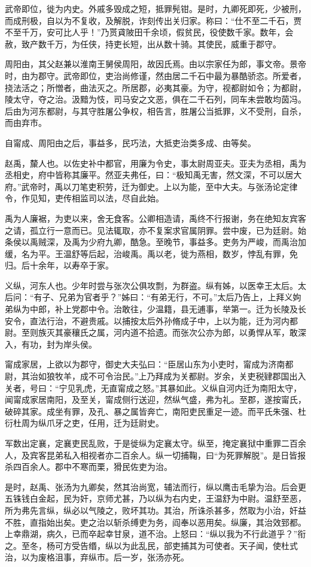 \documentclass[]{article}
\begin{document}
武帝即位，徙为内史。外戚多毁成之短，抵罪髡钳。是时，九卿死即死，少被刑，而成刑极，自以为不复收，及解脱，诈刻传出关归家。称曰：``仕不至二千石，贾不至千万，安可比人乎！''乃贳貣陂田千余顷，假贫民，役使数千家。数年，会赦，致产数千万，为任侠，持吏长短，出从数十骑。其使民，威重于郡守。

周阳由，其父赵兼以淮南王舅侯周阳，故因氏焉。由以宗家任为郎，事文帝。景帝时，由为郡守。武帝即位，吏治尚修谨，然由居二千石中最为暴酷骄恣。所爱者，挠法活之；所憎者，曲法灭之。所居郡，必夷其豪。为守，视都尉如令；为都尉，陵太守，夺之治。汲黯为忮，司马安之文恶，俱在二千石列，同车未尝敢均茵冯。后由为河东都尉，与其守胜屠公争权，相告言，胜屠公当抵罪，义不受刑，自杀，而由弃市。

自甯成、周阳由之后，事益多，民巧法，大抵吏治类多成、由等矣。

赵禹，斄人也。以佐史补中都官，用廉为令史，事太尉周亚夫。亚夫为丞相，禹为丞相史，府中皆称其廉平。然亚夫弗任，曰：``极知禹无害，然文深，不可以居大府。''武帝时，禹以刀笔吏积劳，迁为御史。上以为能，至中大夫。与张汤论定律令，作见知，吏传相监司以法，尽自此始。

禹为人廉裾，为吏以来，舍无食客。公卿相造请，禹终不行报谢，务在绝知友宾客之请，孤立行一意而已。见法辄取，亦不复案求官属阴罪。尝中废，已为廷尉。始条侯以禹贼深，及禹为少府九卿，酷急。至晚节，事益多。吏务为严峻，而禹治加缓，名为平。王温舒等后起，治峻禹。禹以老，徙为燕相，数岁，悖乱有罪，免归。后十余年，以寿卒于家。

义纵，河东人也。少年时尝与张次公俱攻剽，为群盗。纵有姊，以医幸王太后。太后问：``有子、兄弟为官者乎？''姊曰：``有弟无行，不可。''太后乃告上，上拜义姁弟纵为中郎，补上党郡中令。治敢往，少温籍，县无逋事，举第一。迁为长陵及长安令，直法行治，不避贵戚。以捕按太后外孙脩成子中，上以为能，迁为河内都尉。至则族灭其豪穰氏之属，河内道不拾遗。而张次公亦为郎，以勇悍从军，敢深入，有功，封为岸头侯。

甯成家居，上欲以为郡守，御史大夫弘曰：``臣居山东为小吏时，甯成为济南都尉，其治如狼牧羊，成不可令治民。''上乃拜成为关都尉。岁余，关吏税肄郡国出入关者，号曰：``宁见乳虎，无直甯成之怒。''其暴如此。义纵自河内迁为南阳太守，闻甯成家居南阳，及至关，甯成侧行送迎，然纵气盛，弗为礼。至郡，遂按甯氏，破碎其家。成坐有罪，及孔、暴之属皆奔亡，南阳吏民重足一迹。而平氏朱强、杜衍杜周为纵爪牙之吏，任用，迁为廷尉史。

军数出定襄，定襄吏民乱败，于是徙纵为定襄太守。纵至，掩定襄狱中重罪二百余人，及宾客昆弟私入相视者亦二百余人。纵一切捕鞠，曰``为死罪解脱''。是日皆报杀四百余人。郡中不寒而栗，猾民佐吏为治。

是时，赵禹、张汤为九卿矣，然其治尚宽，辅法而行，纵以鹰击毛挚为治。后会更五铢钱白金起，民为奸，京师尤甚，乃以纵为右内史，王温舒为中尉。温舒至恶，所为弗先言纵，纵必以气陵之，败坏其功。其治，所诛杀甚多，然取为小治，奸益不胜，直指始出矣。吏之治以斩杀缚吏为务，阎奉以恶用矣。纵廉，其治效郅都。上幸鼎湖，病久，已而卒起幸甘泉，道不治。上怒曰：``纵以我为不行此道乎？''衔之。至冬，杨可方受告缗，纵以为此乱民，部吏捕其为可使者。天子闻，使杜式治，以为废格沮事，弃纵市。后一岁，张汤亦死。
\end{document}
